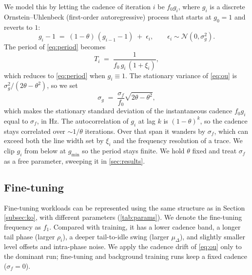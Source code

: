 \documentclass{article}
\begin{document}
We model this by letting the cadence of iteration $i$ be $f_0 g_i$, where $g_i$
is a discrete Ornstein--Uhlenbeck (first-order autoregressive) process that
starts at $g_0 = 1$ and reverts to $1$:
\begin{equation}
	g_i - 1 \;=\; (1-\theta)\,(g_{i-1} - 1) \;+\; \epsilon_i,
	\qquad \epsilon_i \sim \mathcal{N}(0, \sigma_g^2).
	\label{eq:ou}
\end{equation}
The period of \cref{eq:period} becomes
\begin{equation}
	T_i \;=\; \frac{1}{f_0\, g_i\,(1+\xi_i)},
	\label{eq:period_drift}
\end{equation}
which reduces to \cref{eq:period} when $g_i \equiv 1$. The stationary variance
of \cref{eq:ou} is $\sigma_g^2/(2\theta - \theta^2)$, so we set
\begin{equation}
	\sigma_g \;=\; \frac{\sigma_f}{f_0}\sqrt{2\theta - \theta^2},
	\label{eq:ou_sigma}
\end{equation}
which makes the stationary standard deviation of the instantaneous cadence
$f_0 g_i$ equal to $\sigma_f$, in Hz. The autocorrelation of $g_i$ at lag $k$
is $(1-\theta)^k$, so the cadence stays correlated over  $\sim 1/\theta$
iterations. Over that span it wanders by $\sigma_f$, which can exceed both the
line width set by $\xi_i$ and the frequency resolution of a trace. We clip
$g_i$ from below at $g_{\min}$ so the period stays finite. We hold $\theta$ fixed and treat $\sigma_f$ as a free
parameter, sweeping it in \cref{sec:results}.



\subsection{Fine-tuning}
\label{subsec:finetune}
Fine-tuning workloads can be represented using the same structure as in Section \ref{subsec:ko}, with different parameters (\cref{tab:params}). We denote the fine-tuning frequency as $f_1$. Compared with training, it has a lower cadence
band, a longer tail phase (larger $\rho_i$), a deeper tail-to-idle swing (larger
$\mu_\Delta$), and slightly smaller level offsets and intra-phase noise.
We apply the cadence drift of \cref{eq:ou} only to the dominant run;
fine-tuning and background training runs keep a fixed cadence ($\sigma_f = 0$).
\end{document}
